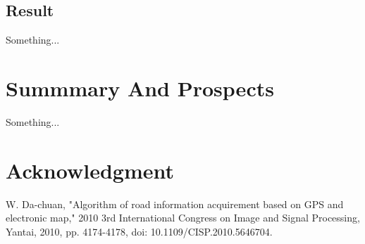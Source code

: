 \documentclass[10pt, conference, compsocconf]{IEEEtran}
\begin{document}
	\subsection{Result}
	
	Something...
	
	\section{Summmary And Prospects}

	Something...
	
	\section*{Acknowledgment}
	
	
	
	
	
	
	
	\begin{thebibliography}{1}
		
		W. Da-chuan, "Algorithm of road information acquirement based on GPS and electronic map," 2010 3rd International Congress on Image and Signal Processing, Yantai, 2010, pp. 4174-4178, doi: 10.1109/CISP.2010.5646704.
		
	\end{thebibliography}
	
	
	
	
\end{document}
